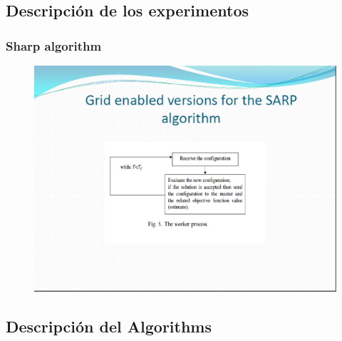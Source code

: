 \documentclass{beamer}
\begin{document}
\subsection{Descripción de los experimentos}
\begin{frame}
\frametitle{Sharp algorithm }
\begin{figure}[!th]
\begin{center}
\includegraphics[width=1\textwidth]{img/pic10.eps}
\end{center}
\end{figure}
\end{frame}

\subsection{Descripción del Algorithms }
\end{document}
